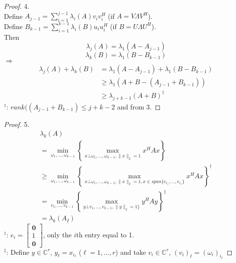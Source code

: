 \begin{multicols}{2}
\begin{proof} 4. \\
    Define $A_{j-1}=\sum_{i=1}^{j-1}\lambda_i(A)v_iv_i^H$ (if $A=V\Lambda V^H $). \\
    Define $B_{k-1}=\sum_{i=1}^{k-1}\lambda_i(B)u_iu_i^H$ (if $B=U\Lambda U^H $). \\
    Then 
    \[
        \lambda_j(A) = \lambda_1(A-A_{j-1})
    \]
    \[
        \lambda_k(B) = \lambda_1(B-B_{k-1})
    \]
    $\Longrightarrow$
    \[
        \begin{array}{ll}
            \lambda_j(A)+\lambda_k(B)   & = \lambda_1(A-A_{j-1})+\lambda_1(B-B_{k-1}) \\
                                        & \geq \lambda_1(A+B-(A_{j-1}+B_{k-1})) \\
                                        & \geq \lambda_{j+k-1}(A+B)^\dagger
        \end{array}
    \]
    $^\dagger$: $rank((A_{j-1}+B_{k-1})\leq j+k-2$ and from 3.
\end{proof}

\begin{proof} 5. 
    \[
        \begin{array}{l}
            \lambda_k(A) \\
            = \underset{\omega_1,...,\omega_{k-1}}{\min} \left\{\underset{x\bot \omega_1,...,\omega_{k-1},\|x\|_2=1}{\max} x^HAx \right\} \\
            \geq \underset{\omega_1,...,\omega_{k-1}}{\min} \left\{\underset{x\bot \omega_1,...,\omega_{k-1},\|x\|_2=1,x\in span\{e_{i_1},...,e_{i_r}\}}{\max} x^HAx \right\} ^\dagger \\
            = \underset{v_1,...,v_{k-1}}{\min} \left\{\underset{y\bot v_1,...,v_{k-1},\|y\|_2=1\}}{\max} y^HAy \right\} ^\ddagger \\
            = \lambda_k(A_I)
        \end{array}
    \]
    $^\dagger$: $e_i=\begin{bmatrix}
        \textbf{0}  \\ 1  \\ \textbf{0}
    \end{bmatrix}$, only the $i$th entry equal to 1. \\
    $^\ddagger$: Define $y\in \mathbb{C}^{r}$, $y_\ell = x_{i_\ell}$ ($\ell = 1,...,r$) and take $v_i\in\mathbb{C}^r$, $(v_i)_\ell = (\omega_i)_{i_\ell}$
\end{proof}


\end{multicols}
